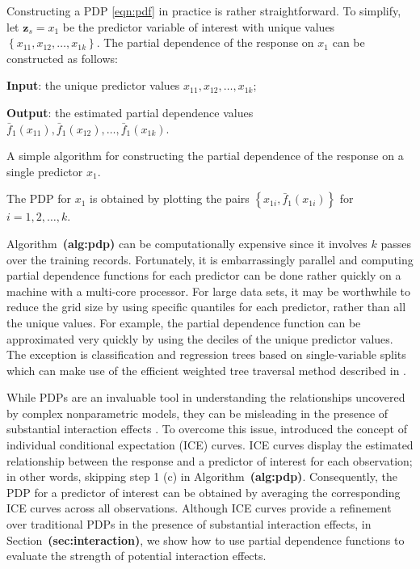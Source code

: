 \documentclass[12pt]{article}
\def\ref#1{\textbf{(#1)}}
\begin{document}
Constructing a PDP \eqref{eqn:pdf} in practice is rather straightforward. To simplify, let $\boldsymbol{z}_s = x_1$ be the predictor variable of interest with unique values $\left\{x_{11}, x_{12}, \dots, x_{1k}\right\}$. The partial dependence of the response on $x_1$ can be constructed as follows:
\begin{algorithm}
  \textbf{Input}: the unique predictor values $x_{11}, x_{12}, \dots, x_{1k}$;

  \textbf{Output}: the estimated partial dependence values $\bar{f}_1\left(x_{11}\right), \bar{f}_1\left(x_{12}\right), \dots, \bar{f}_1\left(x_{1k}\right)$. \BlankLine
    \BlankLine
    \BlankLine
  \caption{A simple algorithm for constructing the partial dependence of the response on a single predictor $x_1$. \label{alg:pdp}}
\end{algorithm}
\newline
The PDP for $x_1$ is obtained by plotting the pairs $\left\{x_{1i}, \bar{f}_1\left(x_{1i}\right)\right\}$ for $i = 1, 2, \dotsc, k$. 

Algorithm~\ref{alg:pdp} can be computationally expensive since it involves $k$ passes over the training records. Fortunately, it is embarrassingly parallel and computing partial dependence functions for each predictor can be done rather quickly on a machine with a multi-core processor. For large data sets, it may be worthwhile to reduce the grid size by using specific quantiles for each predictor, rather than all the unique values. For example, the partial dependence function can be approximated very quickly by using the deciles of the unique predictor values. The exception is classification and regression trees based on single-variable splits which can make use of the efficient weighted tree traversal method described in \citet{friedman-2001-greedy}.

While PDPs are an invaluable tool in understanding the relationships uncovered by complex nonparametric models, they can be misleading in the presence of substantial interaction effects \citep{goldstein-peeking-2015}. To overcome this issue, \citeauthor{goldstein-peeking-2015} introduced the concept of individual conditional expectation (ICE) curves. ICE curves display the estimated relationship between the response and a predictor of interest for each observation; in other words, skipping step 1 (c) in Algorithm~\ref{alg:pdp}. Consequently, the PDP for a predictor of interest can be obtained by averaging the corresponding ICE curves across all observations. Although ICE curves provide a refinement over traditional PDPs in the presence of substantial interaction effects, in Section~\ref{sec:interaction}, we show how to use partial dependence functions to evaluate the strength of potential interaction effects.
\end{document}
